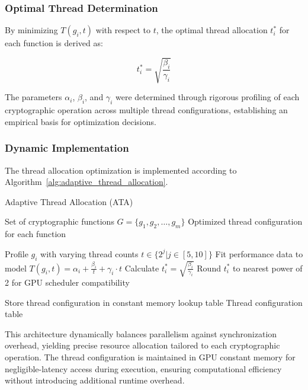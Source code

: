 \documentclass[journal]{IEEEtran}
\begin{document}
\subsubsection{Optimal Thread Determination}

By minimizing $T(g_i, t)$ with respect to $t$, the optimal thread allocation $t_i^*$ for each function is derived as:

\begin{equation}
  \label{eq:optimal_thread_count}
  t_i^* = \sqrt{\frac{\beta_i}{\gamma_i}}
\end{equation}

The parameters $\alpha_i$, $\beta_i$, and $\gamma_i$ were determined through rigorous profiling of each cryptographic operation across multiple thread configurations, establishing an empirical basis for optimization decisions.

\subsubsection{Dynamic Implementation}

The thread allocation optimization is implemented according to Algorithm~\ref{alg:adaptive_thread_allocation}.


\begin{algorithm}
  \caption{Adaptive Thread Allocation (ATA)}
  \label{alg:adaptive_thread_allocation}
  \begin{algorithmic}[1]
    \REQUIRE Set of cryptographic functions $G = \{g_1, g_2, \ldots, g_m\}$
    \ENSURE Optimized thread configuration for each function

    \STATE Profile $g_i$ with varying thread counts $t \in \{2^j | j \in [5, 10]\}$
    \STATE Fit performance data to model $T(g_i, t) = \alpha_i + \frac{\beta_i}{t} + \gamma_i \cdot t$
    \STATE Calculate $t_i^* = \sqrt{\frac{\beta_i}{\gamma_i}}$
    \STATE Round $t_i^*$ to nearest power of 2 for GPU scheduler compatibility
    \ENDFOR

    \STATE Store thread configuration in constant memory lookup table
    \RETURN Thread configuration table
  \end{algorithmic}
\end{algorithm}

This architecture dynamically balances parallelism against synchronization overhead, yielding precise resource allocation tailored to each cryptographic operation. The thread configuration is maintained in GPU constant memory for negligible-latency access during execution, ensuring computational efficiency without introducing additional runtime overhead.
\end{document}
